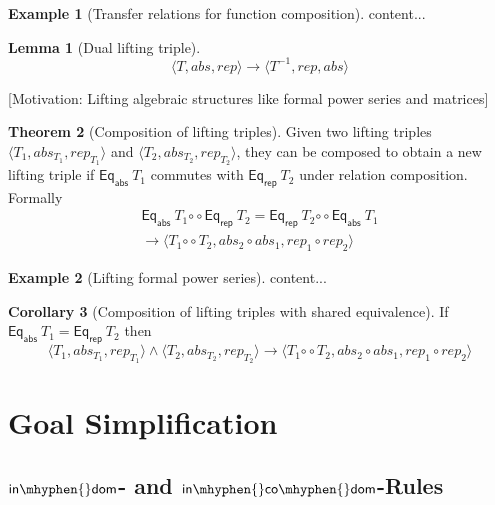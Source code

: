 \documentclass[]{article}
\theoremstyle{definition}
\newtheorem{theorem}{Theorem}[section]
\newtheorem{lemma}[theorem]{Lemma}
\newtheorem{corollary}[theorem]{Corollary}
\newtheorem{example}{Example}[section]
\newcommand{\relcomp}{\mathbin{\circ\circ}}
\newcommand{\inv}{^{-1}}
\newcommand{\indom}{\mathsf{in\mhyphen{}dom}}
\newcommand{\incodom}{\mathsf{in\mhyphen{}co\mhyphen{}dom}}
\newcommand{\eqrep}{\mathsf{Eq_{rep}}}
\newcommand{\eqabs}{\mathsf{Eq_{abs}}}
\begin{document}
\begin{example}[Transfer relations for function composition]
	content...
\end{example}

\begin{lemma}[Dual lifting triple]\label{dual-lifting-triple}
\begin{equation}
	\langle T, abs, rep \rangle \longrightarrow \langle T\inv, rep, abs \rangle
\end{equation}
\end{lemma}

[Motivation: Lifting algebraic structures like formal power series and matrices]

\begin{theorem}[Composition of lifting triples]
	Given two lifting triples \(\langle T_1, abs_{T_1}, rep_{T_1} \rangle \) and \(\langle T_2, abs_{T_2}, rep_{T_2} \rangle \), they can be composed to obtain a new lifting triple if \(\eqabs\ T_1\) commutes with \( \eqrep\ T_2 \) under relation composition. Formally
	\begin{equation}
		\begin{split}
			\eqabs\ T_1 \relcomp \eqrep\ T_2 = \eqrep\ T_2 \relcomp \eqabs\ T_1 \\
			\longrightarrow \langle T_1 \relcomp T_2, abs_2 \circ abs_1, rep_1 \circ rep_2 \rangle
		\end{split}			
	\end{equation}
\end{theorem}

\begin{example}[Lifting formal power series]
	content...
\end{example}

\begin{corollary}[Composition of lifting triples with shared equivalence]
	If \( \eqabs\ T_1 = \eqrep\ T_2 \) then
	\begin{equation}
		\langle T_1, abs_{T_1}, rep_{T_1} \rangle \land \langle T_2, abs_{T_2}, rep_{T_2} \rangle \longrightarrow \langle T_1 \relcomp T_2, abs_2 \circ abs_1, rep_1 \circ rep_2 \rangle
	\end{equation}
\end{corollary}

\section{Goal Simplification}

\subsection{\(\indom\)- and \(\incodom\)-Rules}
\end{document}

